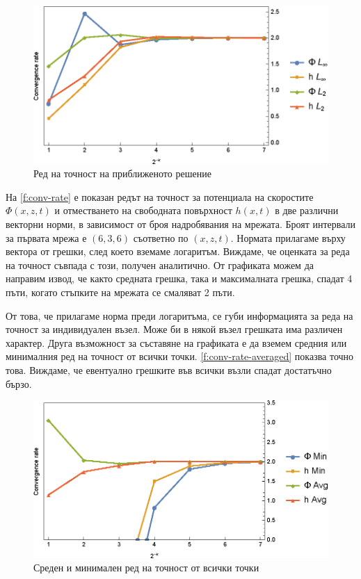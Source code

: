 \documentclass[12pt]{article}
\numberwithin{equation}{section}
\begin{document}
\begin{figure}[h]
    \centering
    \includegraphics{figures/results/convergence-rate.eps}
    \caption{Ред на точност на приближеното решение}
    \label{f:conv-rate}
\end{figure}

На \autoref{f:conv-rate} е показан редът на точност за потенциала на скоростите $\Phi(x,z,t)$ и отместването на свободната повърхност $h(x,t)$ в две различни векторни норми, в зависимост от броя надробявания на мрежата. Броят интервали за първата мрежа е $(6,3,6)$ съответно по $(x, z, t)$. Нормата прилагаме върху вектора от грешки, след което вземаме логаритъм. Виждаме, че оценката за реда на точност съвпада с този, получен аналитично. От графиката можем да направим извод, че както средната грешка, така и максималната грешка, спадат 4 пъти, когато стъпките на мрежата се смаляват 2 пъти.

От това, че прилагаме норма преди логаритъма, се губи информацията за реда на точност за индивидуален възел. Може би в някой възел грешката има различен характер. Друга възможност за съставяне на графиката е да вземем средния или минималния ред на точност от всички точки. \autoref{f:conv-rate-averaged} показва точно това. Виждаме, че евентуално грешките във всички възли спадат достатъчно бързо.

\begin{figure}[h]
    \centering
    \includegraphics{figures/results/convergence-rate-average.eps}
    \caption{Среден и минимален ред на точност от всички точки}
    \label{f:conv-rate-averaged}
\end{figure}
\end{document}
